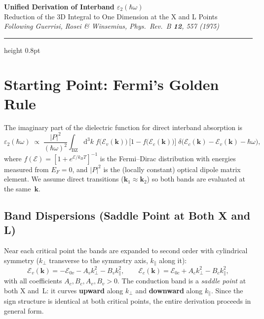 \documentclass[11pt, a4paper]{article}
\newcommand{\E}{\mathcal{E}}
\newcommand{\Ec}{\E_c}
\newcommand{\Ev}{\E_v}
\newcommand{\Eoc}{\E_{0c}}
\newcommand{\Eov}{\E_{0v}}
\newcommand{\kperp}{k_{\!\perp}}
\newcommand{\kpar}{k_{\!\parallel}}
\newcommand{\hw}{\hbar\omega}
\newcommand{\dd}{\mathrm{d}}
\begin{document}
\begin{center}
    {\LARGE \textbf{Unified Derivation of Interband $\varepsilon_2(\hw)$}} \\[6pt]
    {\large Reduction of the 3D Integral to One Dimension at the X and L Points} \\[6pt]
    {\itshape Following Guerrisi, Rosei \& Winsemius, Phys.\ Rev.\ B \textbf{12}, 557 (1975)}
\end{center}
\vspace{4pt}
\hrule height 0.8pt
\vspace{10pt}

\section{Starting Point: Fermi's Golden Rule}

The imaginary part of the dielectric function for direct interband absorption is
\begin{equation}\label{eq:golden}
    \varepsilon_2(\hw) \;\propto\; \frac{|P|^2}{(\hw)^2}
    \int_{\mathrm{BZ}} \dd^{3}k \;
    f\!\bigl(\Ev(\mathbf{k})\bigr)\,
    \bigl[1 - f\!\bigl(\Ec(\mathbf{k})\bigr)\bigr]\;
    \delta\!\bigl(\Ec(\mathbf{k}) - \Ev(\mathbf{k}) - \hw\bigr),
\end{equation}
where $f(\E)=[1+e^{\E/k_BT}]^{-1}$ is the Fermi--Dirac distribution with energies measured from $E_F=0$, and $|P|^2$ is the (locally constant) optical dipole matrix element. We assume direct transitions ($\mathbf{k}_1 \approx \mathbf{k}_2$) so both bands are evaluated at the same~$\mathbf{k}$.

\subsection{Band Dispersions (Saddle Point at Both X and L)}

Near each critical point the bands are expanded to second order with cylindrical symmetry ($\kperp$ transverse to the symmetry axis, $\kpar$ along it):
\begin{equation}\label{eq:bands}
    \boxed{\;
    \Ev(\mathbf{k}) = -\Eov - A_v\kperp^2 - B_v\kpar^2,
    \qquad
    \Ec(\mathbf{k}) = \Eoc + A_c\kperp^2 - B_c\kpar^2,
    \;}
\end{equation}
with all coefficients $A_c, B_c, A_v, B_v > 0$. The conduction band is a \emph{saddle point} at both X and~L: it curves \textbf{upward} along $\kperp$ and \textbf{downward} along $\kpar$. Since the sign structure is identical at both critical points, the entire derivation proceeds in general form.
\end{document}
